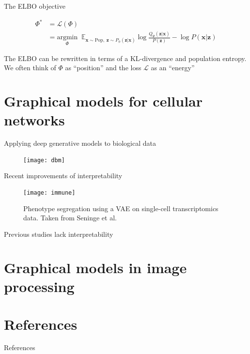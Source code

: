 \documentclass{beamer}					%
\begin{document}
\begin{frame}{The ELBO objective}


\begin{align*}
\Phi^{*} &= \mathcal{L}(\Phi)\\
&= \underset{\Phi}{\mathrm{argmin}} \;\;\mathbb{E}_{\mathbf{x}\sim \mathrm{Pop},\; \mathbf{z}\sim P_{\phi}(\mathbf{\mathbf{z}|\mathbf{x}})} \log \frac{Q_{\Psi}(\mathbf{z}|\mathbf{x})}{P(\mathbf{z})} - \log P(\mathbf{x}|\mathbf{z})
\end{align*}

\vspace{0.1in}
The ELBO can be rewritten in terms of a KL-divergence and population entropy. We often think of $\Phi$ as ``position'' and the loss $\mathcal{L}$ as an ``energy''

\end{frame}


\section{Graphical models for cellular networks}


\begin{frame}{Applying deep generative models to biological data}
\begin{figure}
\texttt{[image: dbm]}
\end{figure}
\end{frame}

\begin{frame}{Recent improvements of interpretability}

\begin{figure}
\begin{center}
\texttt{[image: immune]}
\end{center}
\caption{Phenotype segregation using a VAE on single-cell transcriptomics data. Taken from Seninge et al.}
\end{figure}

\end{frame}

\begin{frame}{Previous studies lack interpretability}

\end{frame}

\section{Graphical models in image processing}




\section{References}

\begin{frame}[allowframebreaks]{References}
	\tiny
	
\end{frame}
\end{document}
